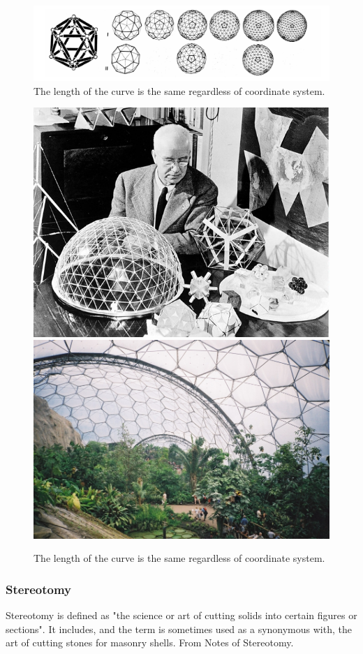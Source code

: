 \begin{figure}[H]
\centering
\includegraphics[height=0.25\linewidth ]{figure/Introduction/TureW6Mod.pdf}
\caption{The length of the curve is the same regardless of coordinate system.}
\end{figure}

\begin{figure}[H]
\centering
\includegraphics[height=0.30\linewidth ]{figure/Introduction/fuller3.jpg}
\includegraphics[height=0.30\linewidth ]{figure/Introduction/Eden.jpg}
\caption{The length of the curve is the same regardless of coordinate system.}
\end{figure}

\subsubsection{Stereotomy }
  
Stereotomy is defined as "the science or art of cutting solids into certain figures or sections". It includes, and the term is sometimes used as a synonymous with, the art of cutting stones for masonry shells. From Notes of Stereotomy.


